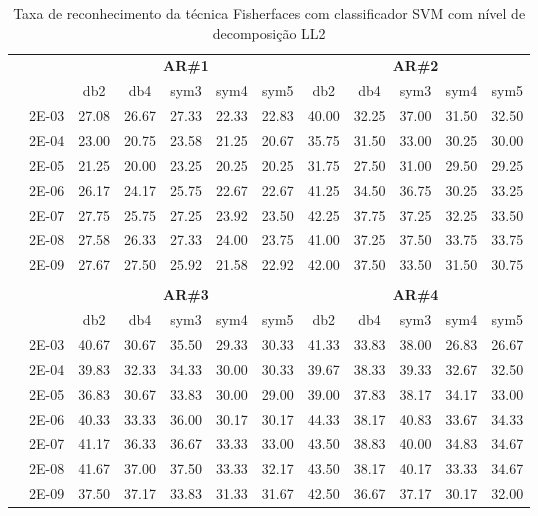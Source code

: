 


\begin{table}[H]
	\centering
    \normalsize
	\caption{Taxa de reconhecimento da técnica Fisherfaces com classificador SVM com nível de decomposição LL2}
	\begin{tabular}{|c|c|c c c c c|c c c c c|}
\cline{3-12}
\multicolumn{2}{c|}{\multirow{2}{*}{}} & \multicolumn{5}{c|}{\textbf{AR\#1}}  & \multicolumn{5}{c|}{\textbf{AR\#2}} \\\cline{3-12}

\multicolumn{2}{c|}{}  & db2 & db4 & sym3 & sym4 & sym5 & db2 & db4& sym3 & sym4 & sym5 \\\hline
\multicolumn{1}{|c|}{ \multirow{6}{*}{\rotatebox[origin=c]{90}{\textbf{Gamma}}} }
&2E-03&	27.08&	26.67&	27.33&	22.33&	22.83&	40.00	&32.25&	37.00&	31.50&	32.50	\\\cline{2-12}
&2E-04&	23.00&	20.75&	23.58&	21.25&	20.67&	35.75	&31.50&	33.00&	30.25&	30.00	\\\cline{2-12}
&2E-05&	21.25&	20.00&	23.25&	20.25&	20.25&	31.75	&27.50&	31.00&	29.50&	29.25	\\\cline{2-12}
&2E-06&	26.17&	24.17&	25.75&	22.67&	22.67&	41.25	&34.50&	36.75&	30.25&	33.25	\\\cline{2-12}
&2E-07&	27.75&	25.75&	27.25&	23.92&	23.50&	42.25	&37.75&	37.25&	32.25&	33.50	\\\cline{2-12}
&2E-08&	27.58&	26.33&	27.33&	24.00&	23.75&	41.00	&37.25&	37.50&	33.75&	33.75	\\\cline{2-12}
&2E-09&	27.67&	27.50&	25.92&	21.58&	22.92&	42.00	&37.50&	33.50&	31.50&	30.75	

\\ \midrule
\multicolumn{12}{c}{}\\ 

\cline{3-12}
\multicolumn{2}{c}{} & \multicolumn{5}{|c|}{\textbf{AR\#3}}  & \multicolumn{5}{c|}{\textbf{AR\#4}} \\\cline{3-12}
\multicolumn{2}{c}{}  & \multicolumn{1}{|c}{db2} & db4 & sym3 & sym4 & sym5 & db2 & db4& sym3 & sym4 & sym5 \\\hline
\multicolumn{1}{|c|}{ \multirow{6}{*}{\rotatebox[origin=c]{90}{\textbf{Gamma}}} }
&2E-03&	40.67&	30.67&	35.50&	29.33&	30.33&	41.33	&33.83&	38.00&	26.83&	26.67	\\\cline{2-12}
&2E-04&	39.83&	32.33&	34.33&	30.00&	30.33&	39.67	&38.33&	39.33&	32.67&	32.50	\\\cline{2-12}
&2E-05&	36.83&	30.67&	33.83&	30.00&	29.00&	39.00	&37.83&	38.17&	34.17&	33.00	\\\cline{2-12}
&2E-06&	40.33&	33.33&	36.00&	30.17&	30.17&	44.33	&38.17&	40.83&	33.67&	34.33	\\\cline{2-12}
&2E-07&	41.17&	36.33&	36.67&	33.33&	33.00&	43.50	&38.83&	40.00&	34.83&	34.67	\\\cline{2-12}
&2E-08&	41.67&	37.00&	37.50&	33.33&	32.17&	43.50	&38.17&	40.17&	33.33&	34.67	\\\cline{2-12}
&2E-09&	37.50&	37.17&	33.83&	31.33&	31.67&	42.50	&36.67&	37.17&	30.17&	32.00	
	

\end{tabular}
\end{table}
